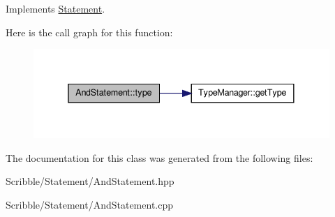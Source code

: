 Implements \hyperlink{class_statement}{Statement}.



Here is the call graph for this function\-:
\nopagebreak
\begin{figure}[H]
\begin{center}
\leavevmode
\includegraphics[width=338pt]{class_and_statement_a61ea1adc2ed965f47e83559bde4a2ffb_cgraph}
\end{center}
\end{figure}




The documentation for this class was generated from the following files\-:\begin{DoxyCompactItemize}
\item 
Scribble/\-Statement/And\-Statement.\-hpp\item 
Scribble/\-Statement/And\-Statement.\-cpp\end{DoxyCompactItemize}
